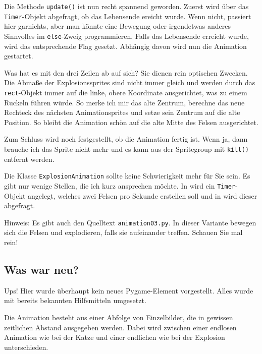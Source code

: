Die Methode \texttt{update()} ist nun recht spannend geworden. Zuerst wird über das \texttt{Timer}-Objekt abgefragt, ob das Lebensende ereicht wurde. Wenn nicht, passiert hier garnichts, aber man könnte eine Bewegung oder irgendetwas anderes Sinnvolles im \texttt{else}-Zweig programmieren. Falls das Lebensende erreicht wurde, wird das entsprechende Flag gesetzt. Abhängig davon wird nun die Animation gestartet. 

Was hat es mit den drei Zeilen ab  auf sich? Sie dienen rein optischen Zwecken. Die Abmaße der Explosionssprites sind nicht immer gleich und werden durch das \texttt{rect}-Objekt immer auf die linke, obere Koordinate ausgerichtet, was zu einem Ruckeln führen würde. So merke ich mir das alte Zentrum, berechne das neue Rechteck des nächsten Animationsprites und setze sein Zentrum auf die alte Position. So bleibt die Animation schön auf die alte Mitte des Felsen ausgerichtet. 

Zum Schluss wird noch festgestellt, ob die Animation fertig ist. Wenn ja, dann brauche ich das Sprite nicht mehr und es kann aus der Spritegroup mit \texttt{kill()} entfernt werden.



Die Klasse \texttt{ExplosionAnimation} sollte keine Schwierigkeit mehr für Sie sein. Es gibt nur wenige Stellen, die ich kurz ansprechen möchte. In  wird ein \texttt{Timer}-Objekt angelegt, welches zwei Felsen pro Sekunde erstellen soll und in  wird dieser abgefragt.


Hinweis: Es gibt auch den Quelltext \texttt{animation03.py}. In dieser Variante bewegen sich die Felsen und explodieren, falls sie aufeinander treffen. Schauen Sie mal rein!

\subsection*{Was war neu?}

Ups! Hier wurde überhaupt kein neues Pygame-Element vorgestellt. Alles wurde mit bereits bekannten Hilfsmitteln umgesetzt. 

Die Animation besteht aus einer Abfolge von Einzelbilder, die in gewissen zeitlichen Abstand ausgegeben werden. Dabei wird zwischen einer endlosen Animation wie bei der Katze und einer endlichen wie bei der Explosion unterschieden.
